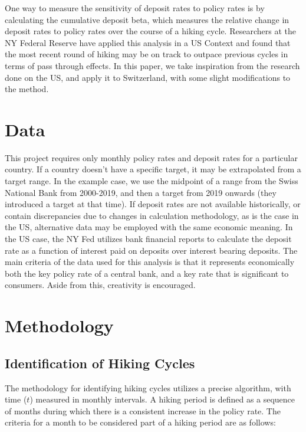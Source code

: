 \documentclass{article}
\begin{document}
One way to measure the sensitivity of deposit rates to policy rates is by calculating the cumulative deposit beta, which measures the relative change in deposit rates to policy rates over the course of a hiking cycle. Researchers at the NY Federal Reserve have applied this analysis in a US Context and found that the most recent round of hiking may be on track to outpace previous cycles in terms of pass through effects\cite{deposit2023}. In this paper, we take inspiration from the research done on the US, and apply it to Switzerland, with some slight modifications to the method.

\section{Data}

This project requires only monthly policy rates and deposit rates for a particular country. If a country doesn't have a specific target, it may be extrapolated from a target range. In the example case, we use the midpoint of a range from the Swiss National Bank from 2000-2019, and then a target from 2019 onwards (they introduced a target at that time). If deposit rates are not available historically, or contain discrepancies due to changes in calculation methodology, as is the case in the US, alternative data may be employed with the same economic meaning. In the US case, the NY Fed utilizes bank financial reports to calculate the deposit rate as a function of interest paid on deposits over interest bearing deposits\cite{deposit2023}. The main criteria of the data used for this analysis is that it represents economically both the key policy rate of a central bank, and a key rate that is significant to consumers. Aside from this, creativity is encouraged.\\

\section{Methodology}

\subsection{Identification of Hiking Cycles}

The methodology for identifying hiking cycles utilizes a precise algorithm, with time (\( t \)) measured in monthly intervals. A hiking period is defined as a sequence of months during which there is a consistent increase in the policy rate. The criteria for a month to be considered part of a hiking period are as follows:
\end{document}
